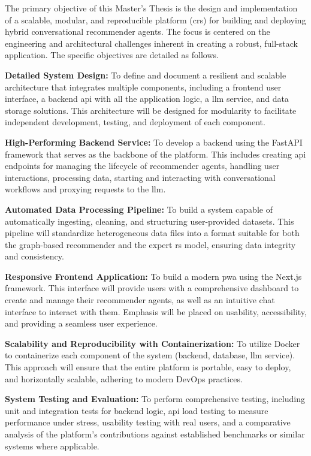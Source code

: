 The primary objective of this Master's Thesis is the design and implementation of a scalable, modular, and reproducible platform (\acl{crs}) for building and deploying hybrid conversational recommender agents. The focus is centered on the engineering and architectural challenges inherent in creating a robust, full-stack application. The specific objectives are detailed as follows.

\begin{objetive}
    \item \textbf{Detailed System Design:} To define and document a resilient and scalable architecture that integrates multiple components, including a frontend user interface, a backend \acs{api} with all the application logic, a \ac{llm} service, and data storage solutions. This architecture will be designed for modularity to facilitate independent development, testing, and deployment of each component.

    \item \textbf{High-Performing Backend Service:} To develop a backend using the FastAPI framework that serves as the backbone of the platform. This includes creating \acs{api} endpoints for managing the lifecycle of recommender agents, handling user interactions, processing data, starting and interacting with conversational workflows and proxying requests to the \ac{llm}.

    \item \textbf{Automated Data Processing Pipeline:} To build a system capable of automatically ingesting, cleaning, and structuring user-provided datasets. This pipeline will standardize heterogeneous data files into a format suitable for both the graph-based recommender and the expert \acs{rs} model, ensuring data integrity and consistency.

    \item \textbf{Responsive Frontend Application:} To build a modern \ac{pwa} using the Next.js framework. This interface will provide users with a comprehensive dashboard to create and manage their recommender agents, as well as an intuitive chat interface to interact with them. Emphasis will be placed on usability, accessibility, and providing a seamless user experience.

    \item \textbf{Scalability and Reproducibility with Containerization:} To utilize Docker to containerize each component of the system (backend, database, \ac{llm} service). This approach will ensure that the entire platform is portable, easy to deploy, and horizontally scalable, adhering to modern DevOps practices.

    \item \textbf{System Testing and Evaluation:} To perform comprehensive testing, including unit and integration tests for backend logic, \acs{api} load testing to measure performance under stress, usability testing with real users, and a comparative analysis of the platform's contributions against established benchmarks or similar systems where applicable.
\end{objetive}
